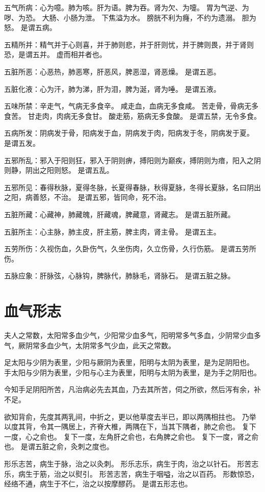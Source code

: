 \documentclass{article}%
\begin{document}
五气所病：心为噫。肺为咳。肝为语。脾为吞。肾为欠、为嚏。
胃为气逆、为哕、为恐。
大肠、小肠为泄。
下焦溢为水。
膀胱不利为癃，不约为遗溺。
胆为怒。
是谓五病。

五精所并：精气并于心则喜，并于肺则悲，并于肝则忧，并于脾则畏，并于肾则恐，是谓五并。
虚而相并者也。

五脏所恶：心恶热，肺恶寒，肝恶风，脾恶湿，肾恶燥。
是谓五恶。

五脏化液：心为汗，肺为涕，肝为泪，脾为涎，肾为唾。
是谓五液。

五味所禁：辛走气，气病无多食辛。
咸走血，血病无多食咸。
苦走骨，骨病无多食苦。
甘走肉，肉病无多食甘。
酸走筋，筋病无多食酸。
是谓五禁，无令多食。

五病所发：阴病发于骨，阳病发于血，阴病发于肉，阳病发于冬，阴病发于夏。
是谓五发。

五邪所乱：邪入于阳则狂，邪入于阴则痹，搏阳则为巅疾，搏阴则为瘖，阳入之阴则静，阴出之阳则怒。
是谓五乱。

五邪所见：春得秋脉，夏得冬脉，长夏得春脉，秋得夏脉，冬得长夏脉，名曰阴出之阳，病善怒，不治。
是谓五邪，皆同命，死不治。

五脏所藏：心藏神，肺藏魄，肝藏魂，脾藏意，肾藏志。
是谓五脏所藏。

五脏所主：心主脉，肺主皮，肝主筋，脾主肉，肾主骨。
是谓五主。

五劳所伤：久视伤血，久卧伤气，久坐伤肉，久立伤骨，久行伤筋。
是谓五劳所伤。

五脉应象：肝脉弦，心脉钩，脾脉代，肺脉毛，肾脉石。
是谓五脏之脉。


\section{血气形志}
夫人之常数，太阳常多血少气，少阳常少血多气，阳明常多气多血，少阴常少血多气，厥阴常多血少气，太阴常多气少血，此天之常数。

足太阳与少阴为表里，少阳与厥阴为表里，阳明与太阴为表里，是为足阴阳也。
手太阳与少阴为表里，少阳与心主为表里，阳明与太阴为表里，是为手之阴阳也。

今知手足阴阳所苦，凡治病必先去其血，乃去其所苦，伺之所欲，然后泻有余，补不足。

欲知背俞，先度其两乳间，中折之，更以他草度去半已，即以两隅相拄也。
乃举以度其背，令其一隅居上，齐脊大椎，两隅在下，当其下隅者，肺之俞也。
复下一度，心之俞也。
复下一度，左角肝之俞也，右角脾之俞也。
复下一度，肾之俞也。
是谓五脏之俞，灸刺之度也。

形乐志苦，病生于脉，治之以灸刺。
形乐志乐，病生于肉，治之以针石。
形苦志乐，病生于筋，治之以熨引。
形苦志苦，病生于咽嗌，治之以百药。
形数惊恐，经络不通，病生于不仁，治之以按摩醪药。
是谓五形志也。
\end{document}
